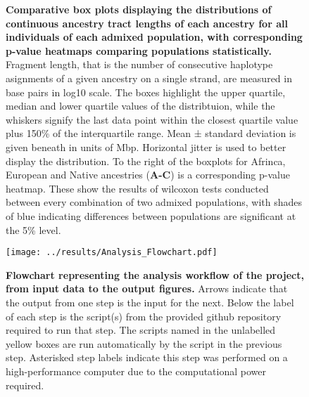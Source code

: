 \documentclass[11pt]{article}
\begin{document}
\begin{figure}[htb!]%
    \centering
     \hspace*{0em}
        \vspace{-0.6cm}
        \caption{\textbf{
            Comparative box plots displaying the distributions of continuous ancestry tract lengths of each ancestry for all individuals of each admixed population, with corresponding p-value heatmaps comparing populations statistically.
        }
        Fragment length, that is the number of consecutive haplotype asignments of a given ancestry on a single strand, are measured in base pairs in log10 scale. The boxes highlight the upper quartile, median and lower quartile values of the distribtuion, while the whiskers signify the last data point within the closest quartile value plus 150\% of the interquartile range. Mean ± standard deviation is given beneath in units of Mbp. Horizontal jitter is used to better display the distribution. To the right of the boxplots for Afrinca, European and Native ancestries (\textbf{A-C}) is a corresponding p-value heatmap. These show the results of wilcoxon tests conducted between every combination of two admixed populations, with shades of blue indicating differences between populations are significant at the 5\% level.
        }
\end{figure}




\begin{figure}[htb!]%
    \centering
    \texttt{[image: ../results/Analysis\_Flowchart.pdf]} 
    \vspace{-2.5cm}
    \caption{\textbf{
        Flowchart representing the analysis workflow of the project, from input data to the output figures. 
    }
        Arrows indicate that the output from one step is the input for the next. Below the label of each step is the script(s) from the provided github repository required to run that step. The scripts named in the unlabelled yellow boxes are run automatically by the script in the previous step. Asterisked step labels indicate this step was performed on a high-performance computer due to the computational power required.
    }
\end{figure}
\end{document}
